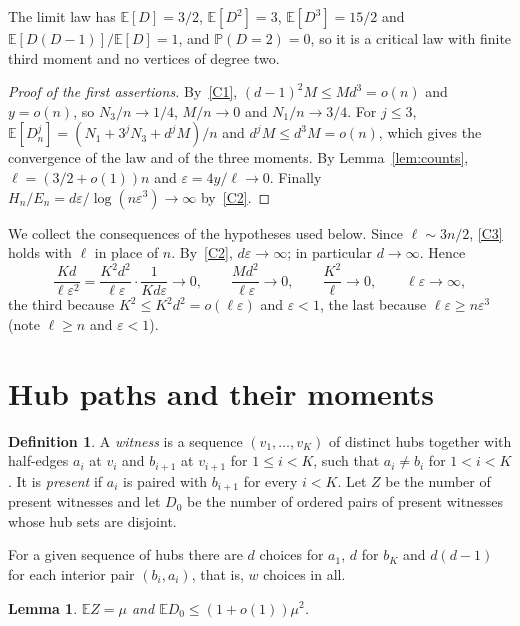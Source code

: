 \documentclass[11pt]{amsart}
\newtheorem{lemma}[theorem]{Lemma}
\theoremstyle{definition}
\newtheorem{definition}[theorem]{Definition}
\theoremstyle{remark}
\numberwithin{equation}{section}
\newcommand{\PP}{\mathbb P}
\newcommand{\E}{\mathbb E}
\newcommand{\eps}{\varepsilon}
\begin{document}
The limit law has $\E[D]=3/2$, $\E[D^2]=3$, $\E[D^3]=15/2$ and $\E[D(D-1)]/\E[D]=1$, and $\PP(D=2)=0$, so it is a critical law with finite third moment and no vertices of degree two.

\begin{proof}[Proof of the first assertions]
By~\ref{C1}, $(d-1)^2M\le Md^3=o(n)$ and $y=o(n)$, so $N_3/n\to1/4$, $M/n\to0$ and $N_1/n\to3/4$. For $j\le3$, $\E[D_n^j]=(N_1+3^jN_3+d^jM)/n$ and $d^jM\le d^3M=o(n)$, which gives the convergence of the law and of the three moments. By Lemma~\ref{lem:counts}, $\ell=(3/2+o(1))n$ and $\eps=4y/\ell\to0$. Finally $H_n/E_n=d\eps/\log(n\eps^3)\to\infty$ by~\ref{C2}.
\end{proof}

We collect the consequences of the hypotheses used below. Since $\ell\sim3n/2$, \ref{C3} holds with $\ell$ in place of $n$. By~\ref{C2}, $d\eps\to\infty$; in particular $d\to\infty$. Hence
\begin{equation}\label{eq:cons}
\frac{Kd}{\ell\eps^2}=\frac{K^2d^2}{\ell\eps}\cdot\frac1{Kd\eps}\to0,\qquad \frac{Md^2}{\ell\eps}\to0,\qquad \frac{K^2}{\ell}\to0,\qquad \ell\eps\to\infty,
\end{equation}
the third because $K^2\le K^2d^2=o(\ell\eps)$ and $\eps<1$, the last because $\ell\eps\ge n\eps^3$ (note $\ell\ge n$ and $\eps<1$).

\section{Hub paths and their moments}

\begin{definition}
A \emph{witness} is a sequence $(v_1,\dots,v_K)$ of distinct hubs together with half-edges $a_i$ at $v_i$ and $b_{i+1}$ at $v_{i+1}$ for $1\le i<K$, such that $a_i\ne b_i$ for $1<i<K$. It is \emph{present} if $a_i$ is paired with $b_{i+1}$ for every $i<K$. Let $Z$ be the number of present witnesses and let $D_0$ be the number of ordered pairs of present witnesses whose hub sets are disjoint.
\end{definition}

For a given sequence of hubs there are $d$ choices for $a_1$, $d$ for $b_K$ and $d(d-1)$ for each interior pair $(b_i,a_i)$, that is, $w$ choices in all.

\begin{lemma}\label{lem:moments}
$\E Z=\mu$ and $\E D_0\le(1+o(1))\mu^2$.
\end{lemma}
\end{document}
